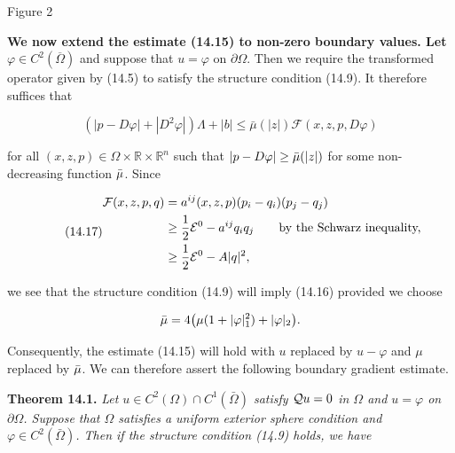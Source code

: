 \begin{center}
Figure 2
\end{center}

\noindent\textbf{We now extend the estimate (14.15) to non-zero boundary values. Let $\varphi\in C^2(\overline{\Omega})$}
and suppose that $u=\varphi$ on $\partial\Omega$. Then we require the transformed operator given by
(14.5) to satisfy the structure condition (14.9). It therefore suffices that

\begin{equation}
\left(|p-D\varphi|+|D^2\varphi|\right)\Lambda+|b|\leq \bar{\mu}(|z|)\mathcal{F}(x,z,p,D\varphi)
\tag{14.16}
\end{equation}






for all $(x, z, p)\in \Omega\times\mathbb{R}\times\mathbb{R}^n$ such that $|p-D\varphi|\geq \bar{\mu}(|z|)$ for some non-decreasing function $\bar{\mu}$. Since

\begin{equation}\tag{14.17}
\begin{aligned}
\mathcal{F}(x, z, p, q)&=a^{ij}(x, z, p)(p_i-q_i)(p_j-q_j)\\
&\geq \frac12 \mathcal{E}^0-a^{ij}q_iq_j \qquad \text{by the Schwarz inequality,}\\
&\geq \frac12 \mathcal{E}^0-A|q|^2,
\end{aligned}
\end{equation}

we see that the structure condition (14.9) will imply (14.16) provided we choose

\[
\bar{\mu}=4\bigl(\mu(1+|\varphi|_1^2)+|\varphi|_2\bigr).
\]

Consequently, the estimate (14.15) will hold with $u$ replaced by $u-\varphi$ and $\mu$ replaced by $\bar{\mu}$. We can therefore assert the following boundary gradient estimate.

\begin{theorem}\label{gt14-boundary-gradient-14-1}
\textbf{Theorem 14.1.} \emph{Let $u\in C^2(\Omega)\cap C^1(\bar{\Omega})$ satisfy $\mathcal{Q} u=0$ in $\Omega$ and $u=\varphi$ on $\partial\Omega$. Suppose that $\Omega$ satisfies a uniform exterior sphere condition and $\varphi\in C^2(\bar{\Omega})$. Then if the structure condition (14.9) holds, we have}
\end{theorem}

